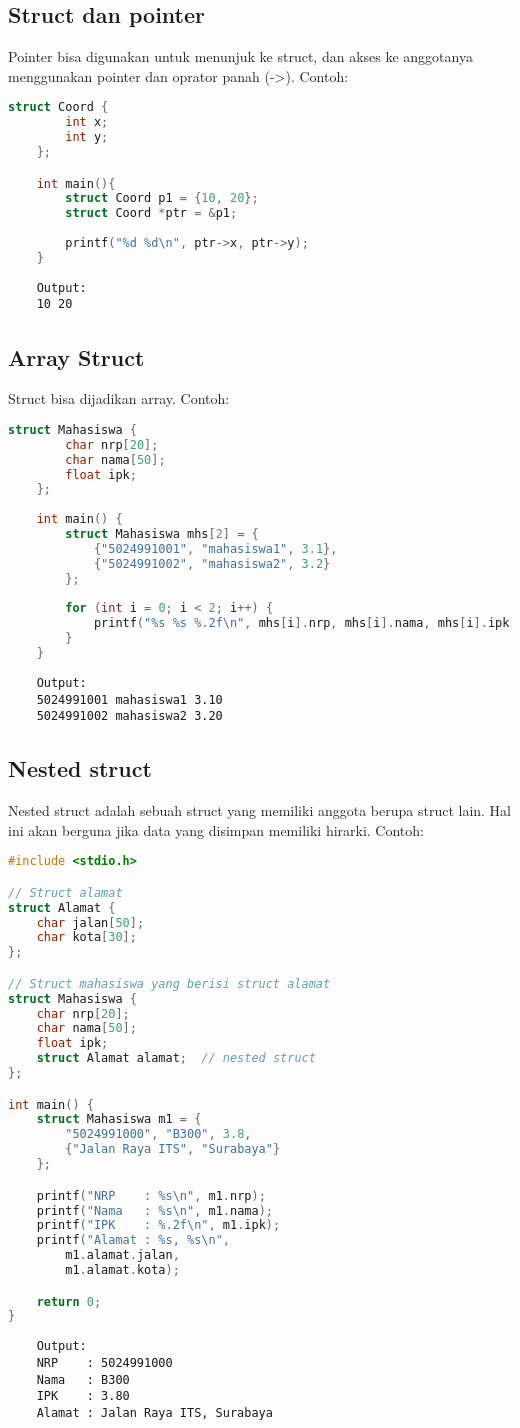 \subsection{Struct dan pointer}

Pointer bisa digunakan untuk menunjuk ke struct, dan akses ke anggotanya menggunakan pointer dan oprator panah (->).
Contoh:
\begin{lstlisting}[language=c]
	struct Coord {
		int x;
		int y;
	};

	int main(){
		struct Coord p1 = {10, 20};
		struct Coord *ptr = &p1;
		
		printf("%d %d\n", ptr->x, ptr->y);
	}
\end{lstlisting}
\begin{verbatim}
    Output:
    10 20   
\end{verbatim}

\subsection{Array Struct}

Struct bisa dijadikan array.
Contoh:
\begin{lstlisting}[language=c]
	struct Mahasiswa {
		char nrp[20];
		char nama[50];
		float ipk;
	};
	
	int main() {
		struct Mahasiswa mhs[2] = {
			{"5024991001", "mahasiswa1", 3.1},
			{"5024991002", "mahasiswa2", 3.2}
		};
	
		for (int i = 0; i < 2; i++) {
			printf("%s %s %.2f\n", mhs[i].nrp, mhs[i].nama, mhs[i].ipk);
		}
	}
\end{lstlisting}
\begin{verbatim}
    Output:
    5024991001 mahasiswa1 3.10
    5024991002 mahasiswa2 3.20
\end{verbatim}

\subsection{Nested struct}

Nested struct adalah sebuah struct yang memiliki anggota berupa struct lain.
Hal ini akan berguna jika data yang disimpan memiliki hirarki.
Contoh:
\begin{lstlisting}[language=c]
#include <stdio.h>

// Struct alamat
struct Alamat {
	char jalan[50];
	char kota[30];
};

// Struct mahasiswa yang berisi struct alamat
struct Mahasiswa {
	char nrp[20];
	char nama[50];
	float ipk;
	struct Alamat alamat;  // nested struct
};

int main() {
	struct Mahasiswa m1 = {
		"5024991000", "B300", 3.8,
		{"Jalan Raya ITS", "Surabaya"}
	};

	printf("NRP    : %s\n", m1.nrp);
	printf("Nama   : %s\n", m1.nama);
	printf("IPK    : %.2f\n", m1.ipk);
	printf("Alamat : %s, %s\n",
		m1.alamat.jalan,
		m1.alamat.kota);

	return 0;
}
\end{lstlisting}
\begin{verbatim}
    Output:
    NRP    : 5024991000
    Nama   : B300
    IPK    : 3.80
    Alamat : Jalan Raya ITS, Surabaya
\end{verbatim}


